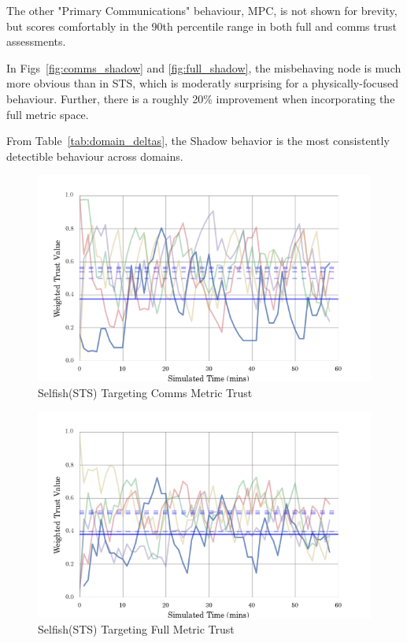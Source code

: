 \documentclass{aamas2016}
\begin{document}
The other "Primary Communications" behaviour, MPC, is not shown for brevity, but scores comfortably in the 90th percentile range in both full and comms trust assessments.

In Figs~\ref{fig:comms_shadow} and \ref{fig:full_shadow}, the misbehaving node is much more obvious than in STS, which is moderatly surprising for a physically-focused behaviour. Further, there is a roughly 20\% improvement when incorporating the full metric space.

From Table~\ref{tab:domain_deltas}, the Shadow behavior is the most consistently detectible behaviour across domains. 

\begin{figure}[h]
	\centering
	\includegraphics[width=\linewidth]{best_comms_run_STS}
	\caption{Selfish(STS) Targeting Comms Metric Trust}
	\label{fig:comms_sts}
\end{figure}

\begin{figure}[h]
	\centering
	\includegraphics[width=\linewidth]{best_full_run_STS}
	\caption{Selfish(STS) Targeting Full Metric Trust}
	\label{fig:full_sts}
\end{figure}
\end{document}
